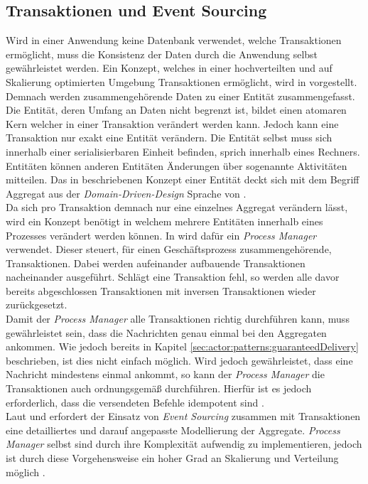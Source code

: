 \subsection{Transaktionen und Event Sourcing}
Wird in einer Anwendung keine Datenbank verwendet, welche Transaktionen ermöglicht, muss die Konsistenz der Daten durch die Anwendung selbst gewährleistet werden. Ein Konzept, welches in einer hochverteilten und auf Skalierung optimierten Umgebung Transaktionen ermöglicht, wird in \cite{helland2007life} vorgestellt. Demnach werden zusammengehörende Daten zu einer Entität zusammengefasst. Die Entität, deren Umfang an Daten nicht begrenzt ist, bildet einen atomaren Kern welcher in einer Transaktion verändert werden kann. Jedoch kann eine Transaktion nur exakt eine Entität verändern. Die Entität selbst muss sich innerhalb einer serialisierbaren Einheit befinden, sprich innerhalb eines Rechners. Entitäten können anderen Entitäten Änderungen über sogenannte Aktivitäten mitteilen. Das in \cite{helland2007life} beschriebenen Konzept einer Entität deckt sich mit dem Begriff Aggregat aus der \textit{Domain-Driven-Design} Sprache von \cite{Evans2004Domain-drivenSoftware}. \\
Da sich pro Transaktion demnach nur eine einzelnes Aggregat verändern lässt, wird ein Konzept benötigt in welchem mehrere Entitäten innerhalb eines Prozesses verändert werden können. In \cite{betts2013CQRSEventSourcing} wird dafür ein \textit{Process Manager} verwendet. Dieser steuert, für einen Geschäftsprozess zusammengehörende, Transaktionen. Dabei werden aufeinander aufbauende Transaktionen nacheinander ausgeführt. Schlägt eine Transaktion fehl, so werden alle davor bereits abgeschlossen Transaktionen mit inversen Transaktionen wieder zurückgesetzt. \\
Damit der \textit{Process Manager} alle Transaktionen richtig durchführen kann, muss gewährleistet sein, dass die Nachrichten genau einmal bei den Aggregaten ankommen. Wie jedoch bereits in Kapitel \ref{sec:actor:patterns:guaranteedDelivery} beschrieben, ist dies nicht einfach möglich. Wird jedoch gewährleistet, dass eine Nachricht mindestens einmal ankommt, so kann der \textit{Process Manager} die Transaktionen auch ordnungsgemäß durchführen. Hierfür ist es jedoch erforderlich, dass die versendeten Befehle idempotent sind \citep{betts2013CQRSEventSourcing}.\\
Laut \cite{betts2013CQRSEventSourcing} und \cite{vernon2013implementing} erfordert der Einsatz von \textit{Event Sourcing} zusammen mit Transaktionen eine detailliertes und darauf angepasste Modellierung der Aggregate. \textit{Process Manager} selbst sind durch ihre Komplexität aufwendig zu implementieren, jedoch ist durch diese Vorgehensweise ein hoher Grad an Skalierung und Verteilung möglich \citep{helland2007life}.
